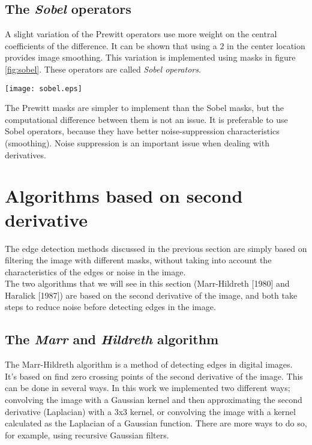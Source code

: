 \documentclass{ipol}
\numberwithin{equation}{section}
\numberwithin{table}{section}
\begin{document}
\subsection{The \textit{Sobel} operators}

A slight variation of the Prewitt operators use more weight on the central coefficients of the 
difference. It can be shown that using a $2$ in the center location provides image smoothing. This
variation is implemented using masks in figure \ref{fig:sobel}. These operators are called 
\textit{Sobel operators}.\\

\begin{SCfigure}[2][!h]
	\centering
	\texttt{[image: sobel.eps]}
	\caption{\textit{Sobel} 2-D masks of size $3\times3$.}
	\label{fig:sobel}
\end{SCfigure}

The Prewitt masks are simpler to implement than the Sobel masks, but the computational difference
between them is not an issue. It is preferable to use Sobel operators, because they have better
noise-suppression characteristics (smoothing). Noise suppression is an important issue when dealing
with derivatives.\\

\section{Algorithms based on second derivative}
\label{sec:second}

The edge detection methods discussed in the previous section are simply based on filtering the 
image with different masks, without taking into account the characteristics of the edges or 
noise in the image.\\

The two algorithms that we will see in this section (Marr-Hildreth [1980] and Haralick [1987]) 
are based on the second derivative of the image, and both take steps to reduce noise before 
detecting edges in the image.\\

\subsection{The \textit{Marr} and \textit{Hildreth} algorithm}

The Marr-Hildreth algorithm is a method of detecting edges in digital 
images. It's based on find zero crossing points of the second derivative
of the image. This can be done in several ways. In this work we implemented 
two different ways; convolving the image with a Gaussian kernel and then 
approximating the second derivative (Laplacian) with a 3x3 kernel, or 
convolving the image with a kernel calculated as the Laplacian of a 
Gaussian function. There are more ways to do so, for example, using 
recursive Gaussian filters.\\ %
\end{document}
